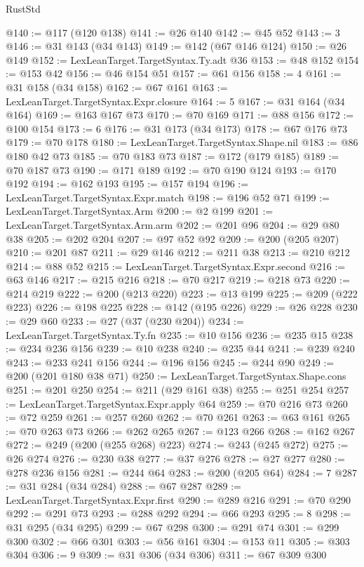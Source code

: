 \begin{lexlean}{RustStd}
\begin{coremodule}
@140 := @117 (@120 @138)
@141 := @26 @140
@142 := @45 @52
@143 := 3
@146 := @31 @143 (@34 @143)
@149 := @142 (@67 @146 @124)
@150 := @26 @149
@152 := LexLeanTarget.TargetSyntax.Ty.adt @36
@153 := @48 @152
@154 := @153 @42
@156 := @46 @154 @51
@157 := @61 @156
@158 := 4
@161 := @31 @158 (@34 @158)
@162 := @67 @161
@163 := LexLeanTarget.TargetSyntax.Expr.closure
@164 := 5
@167 := @31 @164 (@34 @164)
@169 := @163 @167 @73
@170 := @70 @169
@171 := @88 @156
@172 := @100 @154
@173 := 6
@176 := @31 @173 (@34 @173)
@178 := @67 @176 @73
@179 := @70 @178
@180 := LexLeanTarget.TargetSyntax.Shape.nil
@183 := @86 @180 @42 @73
@185 := @70 @183 @73
@187 := @172 (@179 @185)
@189 := @70 @187 @73
@190 := @171 @189
@192 := @70 @190 @124
@193 := @170 @192
@194 := @162 @193
@195 := @157 @194
@196 := LexLeanTarget.TargetSyntax.Expr.match
@198 := @196 @52 @71
@199 := LexLeanTarget.TargetSyntax.Arm
@200 := @2 @199
@201 := LexLeanTarget.TargetSyntax.Arm.arm
@202 := @201 @96
@204 := @29 @80 @38
@205 := @202 @204
@207 := @97 @52 @92
@209 := @200 (@205 @207)
@210 := @201 @87
@211 := @29 @146
@212 := @211 @38
@213 := @210 @212
@214 := @88 @52
@215 := LexLeanTarget.TargetSyntax.Expr.second
@216 := @63 @146
@217 := @215 @216
@218 := @70 @217
@219 := @218 @73
@220 := @214 @219
@222 := @200 (@213 @220)
@223 := @13 @199
@225 := @209 (@222 @223)
@226 := @198 @225
@228 := @142 (@195 @226)
@229 := @26 @228
@230 := @29 @60
@233 := @27 (@37 (@230 @204))
@234 := LexLeanTarget.TargetSyntax.Ty.fn
@235 := @10 @156
@236 := @235 @15
@238 := @234 @236 @156
@239 := @10 @238
@240 := @235 @44
@241 := @239 @240
@243 := @233 @241 @156
@244 := @196 @156
@245 := @244 @90
@249 := @200 (@201 @180 @38 @71)
@250 := LexLeanTarget.TargetSyntax.Shape.cons
@251 := @201 @250
@254 := @211 (@29 @161 @38)
@255 := @251 @254
@257 := LexLeanTarget.TargetSyntax.Expr.apply @64
@259 := @70 @216 @73
@260 := @72 @259
@261 := @257 @260
@262 := @70 @261
@263 := @63 @161
@265 := @70 @263 @73
@266 := @262 @265
@267 := @123 @266
@268 := @162 @267
@272 := @249 (@200 (@255 @268) @223)
@274 := @243 (@245 @272)
@275 := @26 @274
@276 := @230 @38
@277 := @37 @276
@278 := @27 @277
@280 := @278 @236 @156
@281 := @244 @64
@283 := @200 (@205 @64)
@284 := 7
@287 := @31 @284 (@34 @284)
@288 := @67 @287
@289 := LexLeanTarget.TargetSyntax.Expr.first
@290 := @289 @216
@291 := @70 @290
@292 := @291 @73
@293 := @288 @292
@294 := @66 @293
@295 := 8
@298 := @31 @295 (@34 @295)
@299 := @67 @298
@300 := @291 @74
@301 := @299 @300
@302 := @66 @301
@303 := @56 @161
@304 := @153 @11
@305 := @303 @304
@306 := 9
@309 := @31 @306 (@34 @306)
@311 := @67 @309 @300

\end{coremodule}
\end{lexlean}
